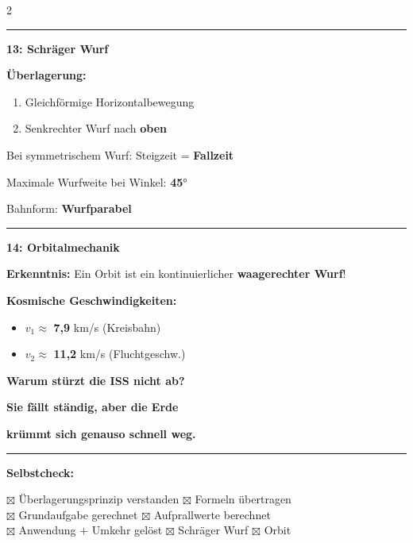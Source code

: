 \documentclass[10pt, a4paper]{article}
\newcommand{\fachfarbe}{physik}
\newcommand{\lsg}[1]{\textcolor{loesung}{\textbf{#1}}}
\newcommand{\schritt}[1]{%
    \vspace{4pt}
    \noindent\textcolor{\fachfarbe}{\rule{0.3cm}{0.3cm}}\hspace{4pt}\textbf{\textcolor{\fachfarbe}{#1}}
    \vspace{2pt}
}
\begin{document}
\begin{multicols}{2}
\schritt{13: Schräger Wurf}

\begin{merkbox}
\textbf{Überlagerung:}
\begin{enumerate}[leftmargin=1.5em]
    \item Gleichförmige Horizontalbewegung
    \item Senkrechter Wurf nach \lsg{oben}
\end{enumerate}

\vspace{4pt}
Bei symmetrischem Wurf: Steigzeit = \lsg{Fallzeit}

\vspace{4pt}
Maximale Wurfweite bei Winkel: \lsg{45}°

\vspace{4pt}
Bahnform: \lsg{Wurfparabel}
\end{merkbox}

\vspace{6pt}

\schritt{14: Orbitalmechanik}

\begin{merkbox}
\textbf{Erkenntnis:} Ein Orbit ist ein kontinuierlicher \lsg{waagerechter Wurf}!

\vspace{6pt}
\textbf{Kosmische Geschwindigkeiten:}
\begin{itemize}[leftmargin=1em]
    \item $v_1 \approx$ \lsg{7,9} km/s \small(Kreisbahn)
    \item $v_2 \approx$ \lsg{11,2} km/s \small(Fluchtgeschw.)
\end{itemize}

\vspace{6pt}
\textbf{Warum stürzt die ISS nicht ab?}

\vspace{2pt}
\lsg{Sie fällt ständig, aber die Erde}

\lsg{krümmt sich genauso schnell weg.}
\end{merkbox}

\vspace{8pt}


\hrule
\vspace{4pt}

{\small\textbf{Selbstcheck:}}

\vspace{2pt}
{\footnotesize
$\boxtimes$ Überlagerungsprinzip verstanden \quad
$\boxtimes$ Formeln übertragen \\
$\boxtimes$ Grundaufgabe gerechnet \quad
$\boxtimes$ Aufprallwerte berechnet \\
$\boxtimes$ Anwendung + Umkehr gelöst \quad
$\boxtimes$ Schräger Wurf \quad
$\boxtimes$ Orbit
}

\end{multicols}
\end{document}
